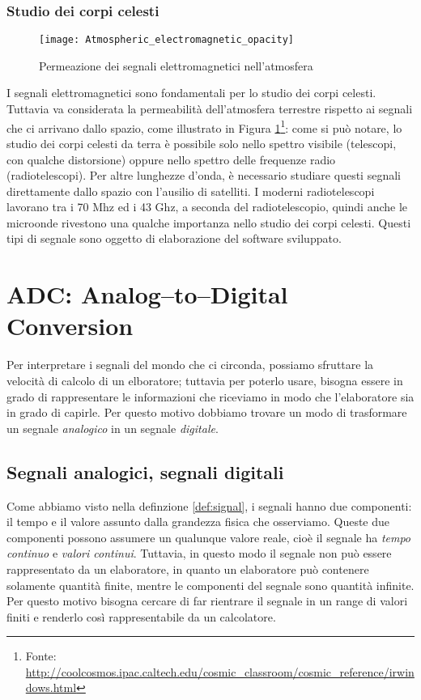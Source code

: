 \subsubsection{Studio dei corpi celesti}
\begin{figure}[htb]
	\begin{center}
		\texttt{[image: Atmospheric\_electromagnetic\_opacity]}
	\end{center}
	\caption{Permeazione dei segnali elettromagnetici nell'atmosfera}
	\label{fig:atm_em_op}
\end{figure}
I segnali elettromagnetici sono fondamentali per lo studio dei corpi celesti.
Tuttavia va considerata la permeabilit\`a dell'atmosfera terrestre rispetto ai
segnali che ci arrivano dallo spazio, come illustrato in Figura
\ref{fig:atm_em_op}\footnote{Fonte:
\url{http://coolcosmos.ipac.caltech.edu/cosmic_classroom/cosmic_reference/irwindows.html}}:
come si pu\`o notare, lo studio dei corpi celesti da terra \`e possibile solo
nello spettro visibile (telescopi, con qualche distorsione) oppure nello spettro
delle frequenze radio (radiotelescopi). Per altre lunghezze d'onda, \`e
necessario studiare questi segnali direttamente dallo spazio con l'ausilio di
satelliti. I moderni radiotelescopi lavorano tra i 70 Mhz ed i 43 Ghz, a seconda
del radiotelescopio, quindi anche le microonde rivestono una qualche importanza
nello studio dei corpi celesti. Questi tipi di segnale sono oggetto di
elaborazione del software sviluppato.

\section{ADC: Analog--to--Digital Conversion}
Per interpretare i segnali del mondo che ci circonda, possiamo sfruttare la
velocit\`a di calcolo di un elboratore; tuttavia per poterlo usare, bisogna
essere in grado di rappresentare le informazioni che riceviamo in modo che
l'elaboratore sia in grado di capirle. Per questo motivo dobbiamo trovare un
modo di trasformare un segnale \emph{analogico} in un segnale \emph{digitale}.

\subsection{Segnali analogici, segnali digitali}
Come abbiamo visto nella definzione \ref{def:signal}, i segnali hanno due
componenti: il tempo e il valore assunto dalla grandezza fisica che osserviamo.
Queste due componenti possono assumere un qualunque valore reale, cio\`e il
segnale ha \emph{tempo continuo} e \emph{valori continui}. Tuttavia, in questo
modo il segnale non pu\`o essere rappresentato da un elaboratore, in quanto un
elaboratore pu\`o contenere solamente quantit\`a finite, mentre le componenti
del segnale sono quantit\`a infinite. Per questo motivo bisogna cercare di far
rientrare il segnale in un range di valori finiti e renderlo cos\`i
rappresentabile da un calcolatore.

